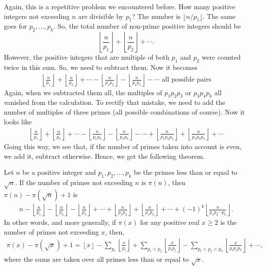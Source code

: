 \documentclass{subfiles}
\begin{document}
		Again, this is a repetitive problem we encountered before. How many positive integers not exceeding $n$ are divisible by $p_1$? The number is $\lfloor {n}/{p_1}\rfloor$. The same goes for $p_2,\ldots,p_k$. So, the total number of non-prime positive integers should be \[\left\lfloor\frac{n}{p_1}\right\rfloor+\left\lfloor\frac{n}{p_2}\right\rfloor+\cdots.\] However, the positive integers that are multiple of both $p_1$ and $p_2$ were counted twice in this sum. So, we need to subtract them. Now it becomes
			\begin{align*}
				\left\lfloor\frac{n}{p_1}\right\rfloor+\left\lfloor\frac{n}{p_2}\right\rfloor+\cdots-\left\lfloor\frac{n}{p_1p_2}\right\rfloor-\left\lfloor\frac{n}{p_1p_3}\right\rfloor-\cdots \mbox{ all possible pairs}
			\end{align*}
		Again, when we subtracted them all, the multiples of $p_1p_2p_3$ or $p_3p_4p_k$ all vanished from the calculation. To rectify that mistake, we need to add the number of multiples of three primes (all possible combinations of course). Now it looks like
			\begin{align*}
				\left\lfloor\frac{n}{p_1}\right\rfloor+\left\lfloor\frac{n}{p_2}\right\rfloor+\cdots-\left\lfloor\frac{n}{p_1p_2}\right\rfloor-\left\lfloor\frac{n}{p_1p_3}\right\rfloor-\cdots+\left\lfloor\frac{n}{p_1p_2p_3}\right\rfloor+\left\lfloor\frac{n}{p_1p_3p_4}\right\rfloor+\cdots
			\end{align*}
		Going this way, we see that, if the number of primes taken into account is even, we add it, subtract otherwise. Hence, we get the following theorem.
			\begin{theorem}\label{thm:numofprime}
	Let $n$ be a positive integer and $p_1,p_2,\ldots,p_k$ be the primes less than or equal to $\sqrt{n}$. If the number of primes not exceeding $n$ is $\pi(n)$, then $\pi(n) -\pi(\sqrt{n})+1$ is
	\begin{align}
		n-\left\lfloor\frac{n}{p_1}\right\rfloor-\left\lfloor\frac{n}{p_2}\right\rfloor-\left\lfloor\frac{n}{p_3}\right\rfloor+\cdots+\left\lfloor\frac{n}{p_1p_2}\right\rfloor+\left\lfloor\frac{n}{p_1p_3}\right\rfloor+\cdots+(-1)^k\left\lfloor\frac{n}{p_1p_2\cdots p_k}\right\rfloor. \label{eq:tau(n)-tau(sqrt(n))+1}
	\end{align}
	In other words, and more generally, if $\pi(x)$ for any positive real $x \geq 2$ is the number of primes not exceeding $x$, then,
	\begin{align}
		\pi(x) -\pi(\sqrt{x})+1 = \left\lfloor x \right\rfloor - \sum_{p_i} \left\lfloor \frac{x}{p_i} \right\rfloor + \sum_{p_i < p_j} \left\lfloor \frac{x}{p_ip_j} \right\rfloor - \sum_{p_i < p_j < p_k} \left\lfloor \frac{x}{p_ip_jp_k} \right\rfloor + \cdots,
	\end{align}
	where the sums are taken over all primes less than or equal to $\sqrt x$.
	\end{theorem}
\end{document}
